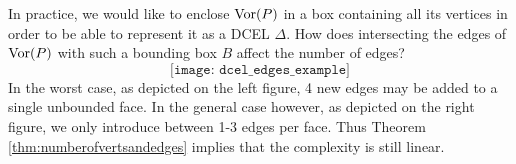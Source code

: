 \begin{rmk} \label{rmk:boxalsohaslinearnumedges}
In practice, we would like to enclose $\operatorname{Vor}(P)$ in a box containing all its vertices in order to be able to represent it as a DCEL $\Delta$. How does intersecting the edges of $\operatorname{Vor}(P)$ with such a bounding box $B$ affect the number of edges?
\[
    \texttt{[image: dcel\_edges\_example]}
\]
In the worst case, as depicted on the left figure, 4 new edges may be added to a single unbounded face. In the general case however, as depicted on the right figure, we only introduce between 1-3 edges per face. Thus Theorem \ref{thm:numberofvertsandedges} implies that the complexity is still linear.
\end{rmk}
